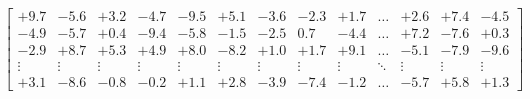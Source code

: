 \documentclass[preview]{standalone}
\begin{document}
\begin{align*}
\begin{bmatrix}+9.7 & -5.6 & +3.2 & -4.7 & -9.5 & +5.1 & -3.6 & -2.3 & +1.7 & \dots & +2.6 & +7.4 & -4.5 \\-4.9 & -5.7 & +0.4 & -9.4 & -5.8 & -1.5 & -2.5 & 0.7 & -4.4 & \dots & +7.2 & -7.6 & +0.3 \\-2.9 & +8.7 & +5.3 & +4.9 & +8.0 & -8.2 & +1.0 & +1.7 & +9.1 & \dots & -5.1 & -7.9 & -9.6 \\\vdots & \vdots & \vdots & \vdots & \vdots & \vdots & \vdots & \vdots & \vdots & \ddots & \vdots & \vdots & \vdots \\+3.1 & -8.6 & -0.8 & -0.2 & +1.1 & +2.8 & -3.9 & -7.4 & -1.2 & \dots & -5.7 & +5.8 & +1.3\end{bmatrix}
\end{align*}
\end{document}
